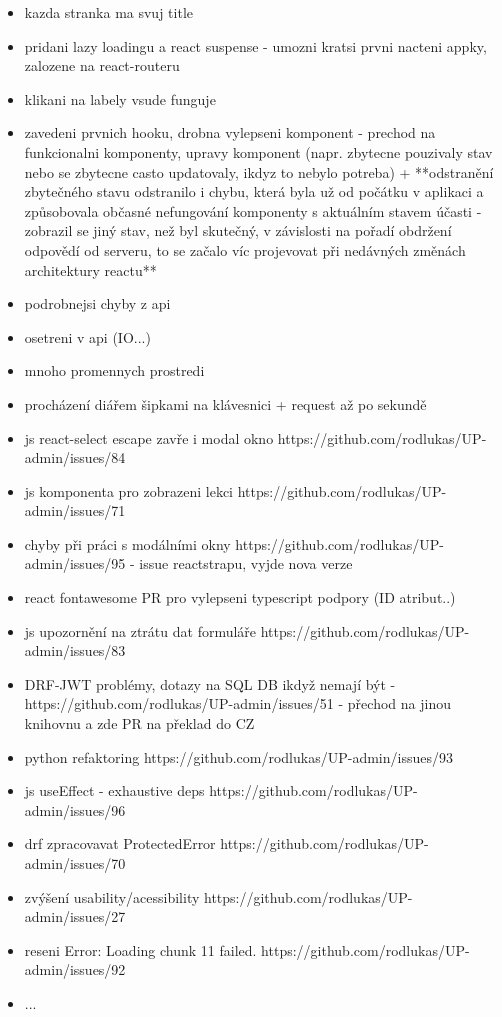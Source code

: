 \begin{itemize}
\item kazda stranka ma svuj title
\item pridani lazy loadingu a react suspense - umozni kratsi prvni nacteni appky, zalozene na react-routeru
\item klikani na labely vsude funguje
\item zavedeni prvnich hooku, drobna vylepseni komponent - prechod na funkcionalni komponenty, upravy komponent (napr. zbytecne pouzivaly stav nebo se zbytecne casto updatovaly, ikdyz to nebylo potreba) + **odstranění zbytečného stavu odstranilo i chybu, která byla už od počátku v aplikaci a způsobovala občasné nefungování komponenty s aktuálním stavem účasti - zobrazil se jiný stav, než byl skutečný, v závislosti na pořadí obdržení odpovědí od serveru, to se začalo víc projevovat při nedávných změnách architektury reactu**
\item podrobnejsi chyby z api
\item osetreni v api (IO...)
\item mnoho promennych prostredi
\item  procházení diářem šipkami na klávesnici + request až po sekundě
\item js react-select escape zavře i modal okno https://github.com/rodlukas/UP-admin/issues/84
\item js komponenta pro zobrazeni lekci https://github.com/rodlukas/UP-admin/issues/71
\item chyby při práci s modálními okny https://github.com/rodlukas/UP-admin/issues/95 - issue reactstrapu, vyjde nova verze
\item react fontawesome PR pro vylepseni typescript podpory (ID atribut..)
\item js upozornění na ztrátu dat formuláře https://github.com/rodlukas/UP-admin/issues/83
\item DRF-JWT problémy, dotazy na SQL DB ikdyž nemají být - https://github.com/rodlukas/UP-admin/issues/51 - přechod na jinou knihovnu a zde PR na překlad do CZ
\item python refaktoring https://github.com/rodlukas/UP-admin/issues/93
\item js useEffect - exhaustive deps https://github.com/rodlukas/UP-admin/issues/96
\item drf zpracovavat ProtectedError https://github.com/rodlukas/UP-admin/issues/70
\item zvýšení usability/acessibility https://github.com/rodlukas/UP-admin/issues/27
\item reseni Error: Loading chunk 11 failed. https://github.com/rodlukas/UP-admin/issues/92
\item ...
\end{itemize}

